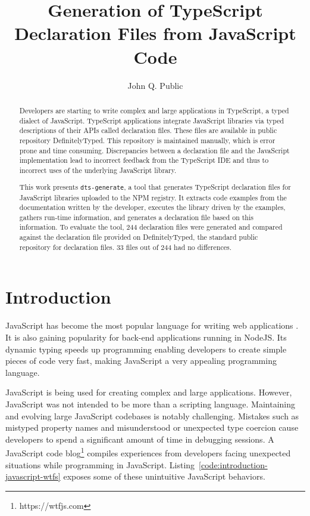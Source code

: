 \documentclass[a4paper,english,cleveref, autoref]{lipics-v2019}
\title{Generation of TypeScript Declaration Files from JavaScript Code}
\author{John Q. Public}{Dummy University Computing Laboratory, Country \and My second affiliation, Country \and \url{http://www.myhomepage.edu} }{johnqpublic@dummyuni.org}{https://orcid.org/0000-0002-1825-0097}{(Optional) author-specific funding acknowledgements}%
\newcommand{\coderef}[1]{Listing~\ref{#1}}
\begin{document}
\maketitle

\begin{abstract}
Developers are starting to write complex and large applications in
TypeScript, a typed dialect of JavaScript. TypeScript applications
integrate JavaScript libraries via typed descriptions of their APIs
called declaration files. These files are available in public
repository DefinitelyTyped.
This repository is maintained manually, which
is error prone and time consuming. Discrepancies between a
declaration file and the JavaScript implementation lead to
incorrect feedback from the TypeScript IDE and thus to incorrect uses
of the underlying JavaScript library.

This work presents \lstinline{dts-generate}, a tool that generates
TypeScript declaration files for JavaScript libraries uploaded to the NPM
registry. It extracts code examples from the documentation written by
the developer, executes the library driven by the examples, gathers
run-time information, and generates a declaration file based on this
information. To evaluate the tool, 244 declaration files were generated and 
compared against the declaration file provided on DefinitelyTyped, the
standard public repository for declaration files. 33 files out of 244 had no differences. 
\end{abstract}

\section{Introduction}
JavaScript has become the most popular language for writing web applications \cite{github-statistics}. It is also gaining popularity for back-end applications running in NodeJS. Its dynamic typing speeds up programming enabling developers to create simple pieces of code very fast, making JavaScript a very appealing programming language.

JavaScript is being used for creating complex and large applications. However, JavaScript was not intended to be more than a scripting language. Maintaining and evolving large JavaScript codebases is notably challenging. Mistakes such as mistyped property names and misunderstood or unexpected type coercion cause developers to spend a significant amount of time in debugging sessions. A JavaScript code blog\footnote{https://wtfjs.com} compiles experiences from developers facing unexpected situations while programming in JavaScript. \coderef{code:introduction-javascript-wtfs} exposes some of these unintuitive JavaScript behaviors.
\end{document}
